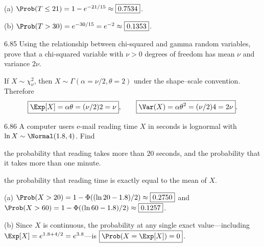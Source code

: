 \documentclass[11pt,oneside]{article}
\begin{document}
\begin{solution}
\noindent\textup{(a)} $\Prob(T\le21)=1-e^{-21/15}\approx\boxed{0.7534}$.

\noindent\textup{(b)} $\Prob(T>30)=e^{-30/15}=e^{-2}\approx\boxed{0.1353}$.
\end{solution}

\begin{exercise}{6.85}
Using the relationship between chi-squared and gamma random variables, prove that a chi-squared variable with $\nu>0$ degrees of freedom has mean $\nu$ and variance $2\nu$.
\end{exercise}

\begin{solution}
If $X\sim\chi_\nu^2$, then $X\sim\Gamma(\alpha=\nu/2,\theta=2)$ under the shape--scale convention. Therefore
\[
\boxed{\Exp[X]=\alpha\theta=(\nu/2)2=\nu},\qquad
\boxed{\Var(X)=\alpha\theta^2=(\nu/2)4=2\nu}.
\]
\end{solution}

\begin{exercise}{6.86}
A computer user\textquotesingle s e-mail reading time $X$ in seconds is lognormal with $\ln X\sim\Normal(1.8,4)$. Find
\begin{exercisesubparts}
\item the probability that reading takes more than $20$ seconds, and the probability that it takes more than one minute.
\item the probability that reading time is exactly equal to the mean of $X$.
\end{exercisesubparts}
\end{exercise}

\begin{solution}
\noindent\textup{(a)} $\Prob(X>20)=1-\Phi((\ln20-1.8)/2)\approx\boxed{0.2750}$ and $\Prob(X>60)=1-\Phi((\ln60-1.8)/2)\approx\boxed{0.1257}$.

\noindent\textup{(b)} Since $X$ is continuous, the probability at any single exact value---including $\Exp[X]=e^{1.8+4/2}=e^{3.8}$---is $\boxed{\Prob(X=\Exp[X])=0}$.
\end{solution}
\end{document}
